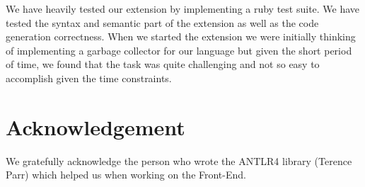 \documentclass[11pt]{article}
\begin{document}
We have heavily tested our extension by implementing a ruby test suite. We have tested the syntax and semantic part of the extension as well as the code generation correctness. When we started the extension we were initially thinking of implementing a garbage collector for our language but given the short period of time, we found that the task was quite challenging and not so easy to accomplish given the time constraints.

\section{Acknowledgement}
We gratefully acknowledge the person who wrote the ANTLR4 library (Terence Parr) which helped us when working on the Front-End.
\end{document}
